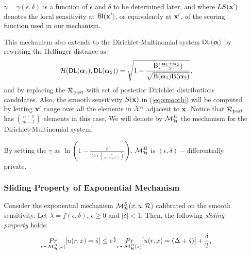 \documentclass[sigconf]{acmart}
\begin{document}
$\gamma = \gamma(\epsilon, \delta)$ is a function of $\epsilon$ and $\delta$ to
be determined later, and where $LS(\textbf{x}')$ denotes the local
sensitivity at $\mathsf{BI}(\textbf{x}')$, or equivalently at $\textbf{x}'$,
of the scoring function used in our mechanism.

This mechanism also extends to the Dirichlet-Multinomial system $\mathsf{DL}(\boldsymbol{\alpha})$ by rewriting the Hellinger distance as:
\[
  \mathcal{H}(\mathsf{DL}(\boldsymbol{\alpha}_1), \mathsf{DL}(\boldsymbol{\alpha}_2)) = \sqrt{1 - \frac{\textup{B}(\frac{\boldsymbol{\alpha}_1 + \boldsymbol{\alpha}_2}{2})}{\sqrt{\textup{B}(\boldsymbol{\alpha}_1) \textup{B}(\boldsymbol{\alpha}_2)}}},
\]
and by replacing the $\mathcal{R}_{\textup{post}}$ with set of posterior Dirichlet
distributions candidates. Also, the smooth sensitivity $S(\textbf{x})$
in (\ref{eq:smooth}) will be computed by letting $\textbf{x}'$ range
over all the elements in $\mathcal{X}^{n}$ adjacent to $\textbf{x}$. Notice
that $\mathcal{R}_{\textup{post}}$ has $\binom{n + 1}{m - 1}$ elements in this case. We
will denote by $\mathcal{M}^{D}_{\mathcal{H}}$ the mechanism for the
Dirichlet-Multinomial system.


By setting the $\gamma$ as $\ln(1 - \frac{\epsilon}{2 \ln (\frac{\delta}{2 (n + 1)})})$, $\mathcal{M}^{B}_{\mathcal{H}}$ is $(\epsilon, \delta) -$differentially private.


\subsubsection{Sliding Property of Exponential Mechanism}
\begin{lem}
Consider the exponential mechanism  $\mathcal{M}_E^S(x,u,\mathcal{R})$
calibrated on the smooth sensitivity. Let $\lambda = f(\epsilon,
\delta)$, $\epsilon\geq 0$ and $|\delta| < 1$. Then, the following \emph{sliding property} holds:
\begin{equation*}
\underset{r \thicksim \mathcal{M}^{B}_{\mathcal{H}}(x)}{Pr}[u(r,x) = \hat{s}]
\leq
e^{\frac{\epsilon}{2}} \underset{r \thicksim \mathcal{M}^{B}_{\mathcal{H}}(x)}{Pr}[u(r,x) = (\Delta + \hat{s})] + \frac{\delta}{2},
\end{equation*}

\end{lem}
\end{document}
